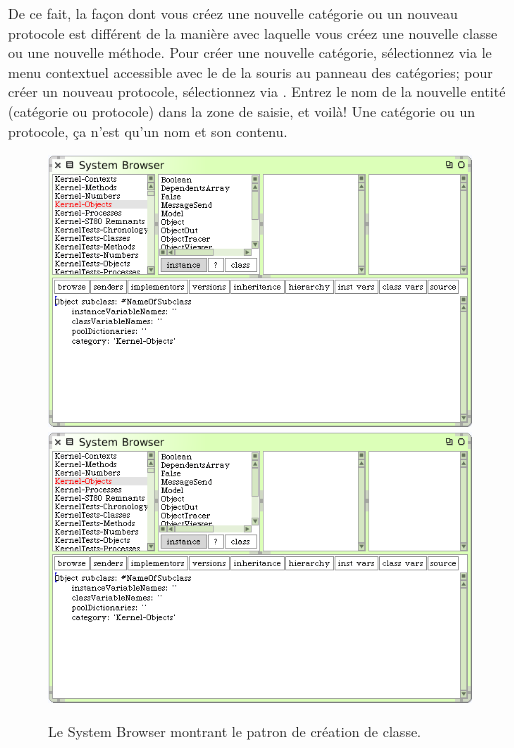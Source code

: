 \documentclass[a4paper,10pt,twoside]{book}
\begin{document}
De ce fait, la fa\c{c}on dont vous cr\'eez une nouvelle cat\'egorie ou
un nouveau protocole est diff\'erent de la mani\`ere avec laquelle
vous cr\'eez une nouvelle classe ou une nouvelle m\'ethode. 
Pour cr\'eer une nouvelle cat\'egorie, s\'electionnez 
  via le menu contextuel accessible avec le
  de la souris
 au panneau des cat\'egories; pour cr\'eer un nouveau protocole, 
s\'electionnez  via 
.
Entrez le nom de la nouvelle entit\'e (cat\'egorie ou protocole) dans
la zone de saisie, et voil\`a! 
Une cat\'egorie ou un protocole, \c{c}a n'est qu'un nom et son contenu.

\begin{figure}[htbp]
   \centering
   \ifluluelse
	   {\includegraphics[width=\textwidth]{SystemBrowserClassCreation}}
	   {\includegraphics[scale=.7]{SystemBrowserClassCreation}}
   \caption{Le System Browser montrant le patron de cr\'eation de classe.
   \label{fig:SystemBrowserClassCreation}}
\end{figure}
\end{document}
